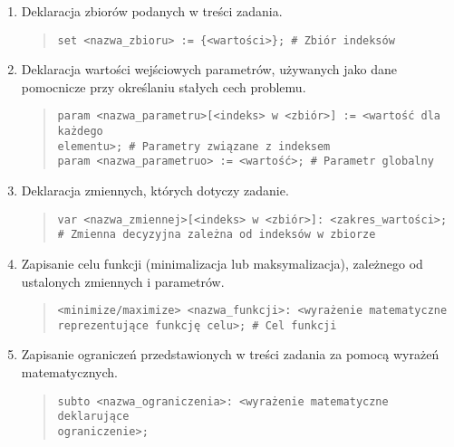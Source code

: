 \begin{enumerate}
\item Deklaracja zbiorów podanych w treści zadania.

\begin{quote}
\begin{verbatim}
set <nazwa_zbioru> := {<wartości>}; # Zbiór indeksów
\end{verbatim}
\end{quote}

\item Deklaracja wartości wejściowych parametrów, używanych jako dane pomocnicze przy określaniu stałych cech problemu.

\begin{quote}
\begin{verbatim}
param <nazwa_parametru>[<indeks> w <zbiór>] := <wartość dla każdego
elementu>; # Parametry związane z indeksem
param <nazwa_parametruo> := <wartość>; # Parametr globalny
\end{verbatim}
\end{quote}

\item Deklaracja zmiennych, których dotyczy zadanie.

\begin{quote}
\begin{verbatim}
var <nazwa_zmiennej>[<indeks> w <zbiór>]: <zakres_wartości>;
# Zmienna decyzyjna zależna od indeksów w zbiorze
\end{verbatim}
\end{quote}

\item Zapisanie celu funkcji (minimalizacja lub maksymalizacja), zależnego od ustalonych zmiennych i parametrów.

\begin{quote}
\begin{verbatim}
<minimize/maximize> <nazwa_funkcji>: <wyrażenie matematyczne
reprezentujące funkcję celu>; # Cel funkcji
\end{verbatim}
\end{quote}

\item Zapisanie ograniczeń przedstawionych w treści zadania za pomocą wyrażeń matematycznych.

\begin{quote}
\begin{verbatim}
subto <nazwa_ograniczenia>: <wyrażenie matematyczne deklarujące
ograniczenie>;
\end{verbatim}
\end{quote}
\end{enumerate}

